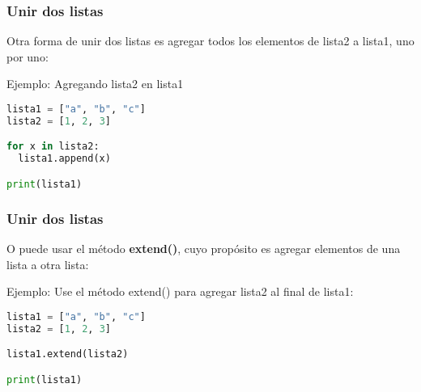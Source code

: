 \begin{frame}[fragile]
  \frametitle{Unir dos listas}

  Otra forma de unir dos listas es agregar todos los elementos
  de lista2 a lista1, uno por uno:

  \vspace{\baselineskip}
  Ejemplo: Agregando lista2 en lista1
  \begin{lstlisting}[language=Python]
lista1 = ["a", "b", "c"]
lista2 = [1, 2, 3]

for x in lista2:
  lista1.append(x)

print(lista1)
  \end{lstlisting}
\end{frame}

\begin{frame}[fragile]
  \frametitle{Unir dos listas}

  O puede usar el método \textbf{extend()}, cuyo propósito es
  agregar elementos de una lista a otra lista:

  \vspace{\baselineskip}
  Ejemplo: Use el método extend() para agregar lista2 al final de lista1:
  \begin{lstlisting}[language=Python]
lista1 = ["a", "b", "c"]
lista2 = [1, 2, 3]

lista1.extend(lista2)

print(lista1)
  \end{lstlisting}
\end{frame}
